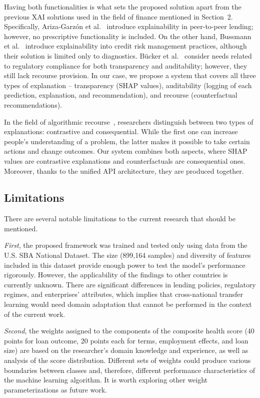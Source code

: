 Having both functionalities is what sets the proposed solution apart from the previous XAI solutions used in the field of finance mentioned in Section~2. Specifically, Ariza-Garz\'{o}n et al.~\cite{22} introduce explainability in peer-to-peer lending; however, no prescriptive functionality is included. On the other hand, Bussmann et al.~\cite{23} introduce explainability into credit risk management practices, although their solution is limited only to diagnostics. B\"{u}cker et al.~\cite{24} consider needs related to regulatory compliance for both transparency and auditability; however, they still lack recourse provision. In our case, we propose a system that covers all three types of explanation -- transparency (SHAP values), auditability (logging of each prediction, explanation, and recommendation), and recourse (counterfactual recommendations).

In the field of algorithmic recourse~\cite{21}, researchers distinguish between two types of explanations: contrastive and consequential. While the first one can increase people's understanding of a problem, the latter makes it possible to take certain actions and change outcomes. Our system combines both aspects, where SHAP values are contrastive explanations and counterfactuals are consequential ones. Moreover, thanks to the unified API architecture, they are produced together.

\subsection{Limitations}

There are several notable limitations to the current research that should be mentioned.

\textit{First}, the proposed framework was trained and tested only using data from the U.S. SBA National Dataset. The size (899,164 samples) and diversity of features included in this dataset provide enough power to test the model's performance rigorously. However, the applicability of the findings to other countries is currently unknown. There are significant differences in lending policies, regulatory regimes, and enterprises' attributes, which implies that cross-national transfer learning would need domain adaptation that cannot be performed in the context of the current work.

\textit{Second}, the weights assigned to the components of the composite health score (40 points for loan outcome, 20 points each for terms, employment effects, and loan size) are based on the researcher's domain knowledge and experience, as well as analysis of the score distribution. Different sets of weights could produce various boundaries between classes and, therefore, different performance characteristics of the machine learning algorithm. It is worth exploring other weight parameterizations as future work.

